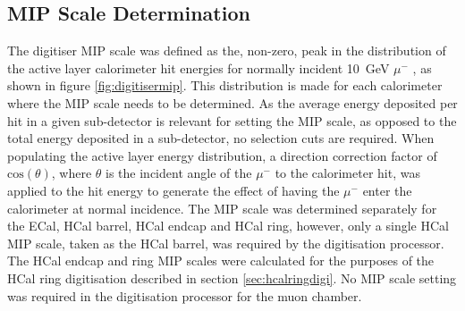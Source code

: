 \subsection{MIP Scale Determination}
\label{sec:mipresponse}
The digitiser MIP scale was defined as the, non-zero, peak in the distribution of the active layer calorimeter hit energies for normally incident 10~GeV $\mu^{-}$ \cite{Bichsel:2004ej}, as shown in figure \ref{fig:digitisermip}.  This distribution is made for each calorimeter where the MIP scale needs to be determined.  As the average energy deposited per hit in a given sub-detector is relevant for setting the MIP scale, as opposed to the total energy deposited in a sub-detector, no selection cuts are required.  When populating the active layer energy distribution, a direction correction factor of $\text{cos}(\theta)$, where $\theta$ is the incident angle of the $\mu^{-}$ to the calorimeter hit, was applied to the hit energy to generate the effect of having the $\mu^{-}$ enter the calorimeter at normal incidence.  The MIP scale was determined separately for the ECal, HCal barrel, HCal endcap and HCal ring, however, only a single HCal MIP scale, taken as the HCal barrel, was required by the digitisation processor.  The HCal endcap and ring MIP scales were calculated for the purposes of the HCal ring digitisation described in section \ref{sec:hcalringdigi}.  No MIP scale setting was required in the digitisation processor for the muon chamber.  

